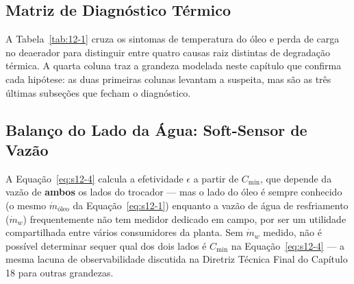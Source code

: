 \documentclass[12pt,a4paper]{article}
\numberwithin{equation}{section}
\numberwithin{table}{section}
\numberwithin{figure}{section}
\begin{document}
	\subsection{\textbf{Matriz de Diagnóstico Térmico}}
	A Tabela~\ref{tab:12-1} cruza os sintomas de temperatura do óleo e perda de carga no deaerador para distinguir entre quatro causas raiz distintas de degradação térmica. A quarta coluna traz a grandeza modelada neste capítulo que confirma cada hipótese: as duas primeiras colunas levantam a suspeita, mas são as três últimas subseções que fecham o diagnóstico.
	\begin{table}[H]
		\centering
		\caption[Matriz de diagnóstico térmico do circuito de óleo]{Matriz de diagnóstico térmico do sistema de lubrificação e resfriamento, com a grandeza que confirma cada causa raiz.}
		\label{tab:12-1}
	\end{table}

	\subsection{\textbf{Balanço do Lado da Água: Soft-Sensor de Vazão}}
	A Equação~\eqref{eq:s12-4} calcula a efetividade $\epsilon$ a partir de $C_{\min}$, que depende da vazão de \textbf{ambos} os lados do trocador — mas o lado do óleo é sempre conhecido (o mesmo $\dot{m}_{\text{óleo}}$ da Equação~\eqref{eq:s12-1}) enquanto a vazão de água de resfriamento ($\dot{m}_w$) frequentemente não tem medidor dedicado em campo, por ser um utilidade compartilhada entre vários consumidores da planta. Sem $\dot{m}_w$ medido, não é possível determinar sequer qual dos dois lados é $C_{\min}$ na Equação~\eqref{eq:s12-4} — a mesma lacuna de observabilidade discutida na Diretriz Técnica Final do Capítulo 18 para outras grandezas.
\end{document}
